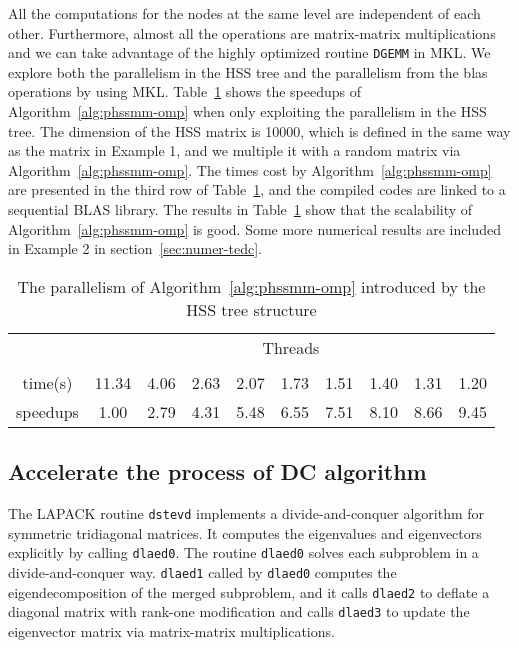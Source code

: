 \documentclass[times]{nlaauth}
\newcounter{algorithm}
\begin{document}
All the computations for the nodes at the same level are independent of each other.
Furthermore, almost all the operations are matrix-matrix multiplications and we can take advantage of
the highly optimized routine \texttt{DGEMM} in MKL.
We explore both the parallelism in the HSS tree and the parallelism
from the blas operations by using MKL.
Table~\ref{tab:hss_parallel} shows the speedups of Algorithm~\ref{alg:phssmm-omp} when
only exploiting the parallelism in the HSS tree.
The dimension of the HSS matrix is 10000, which is defined in the same way
as the matrix  in Example 1, and we multiple it with a 
random matrix via Algorithm~\ref{alg:phssmm-omp}.
The times cost by Algorithm~\ref{alg:phssmm-omp} are presented in the third row of Table~\ref{tab:hss_parallel},
and the compiled codes are linked to a sequential BLAS library.
The results in Table~\ref{tab:hss_parallel} show that the scalability of Algorithm~\ref{alg:phssmm-omp} is good.
Some more numerical results are included in Example 2 in section~\ref{sec:numer-tedc}.

\begin{table}[ptbh]
\caption{The parallelism of Algorithm~\ref{alg:phssmm-omp} introduced by the HSS tree structure}\label{tab:hss_parallel}
\begin{center}\begin{tabular}
[c]{|c|c|c|c|c|c|c|c|c|c|} \hline
\multirow{2}{*}{} & \multicolumn{9}{c|}{Threads}  \\ \cline{2-10}
                  &  &   &   &   &   &  &  &  &   \\ \hline \hline
time(s)           &  11.34 & 4.06 & 2.63 & 2.07 & 1.73 & 1.51 & 1.40 & 1.31 & 1.20   \\ \hline
speedups          &  1.00  & 2.79 & 4.31 & 5.48 & 6.55 & 7.51 & 8.10 & 8.66 & 9.45  \\ \hline
\end{tabular}
\end{center}
\end{table}


\subsection{Accelerate the process of DC algorithm}

The LAPACK routine \texttt{dstevd} implements a divide-and-conquer algorithm for
symmetric tridiagonal matrices.
It computes the eigenvalues and eigenvectors
explicitly by calling \texttt{dlaed0}.
The routine \texttt{dlaed0} solves each subproblem in a divide-and-conquer way.
\texttt{dlaed1} called by \texttt{dlaed0} computes the eigendecomposition of the merged subproblem,
and it calls \texttt{dlaed2} to deflate a diagonal matrix with rank-one modification and calls \texttt{dlaed3}
to update the eigenvector matrix via matrix-matrix multiplications.
\end{document}
